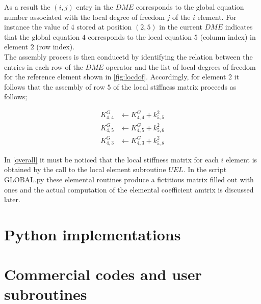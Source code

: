 As a result the $(i,j)$ entry in the $DME$ corresponds to the global equation number associated with the local degree of freedom $j$ of the $i$ element. For instance the value of $4$ stored at position $(2,5)$ in the current $DME$ indicates that the global equation $4$ corresponds to the local equation $5$ (column index) in element $2$ (row index).\\

The assembly process is then conducetd by identifying the relation between the entries in each row of the $DME$ operator and the list of local degrees of freedom for the reference element shown in \cref{fig:locdof}. Accordingly, for element 2 it follows that the assembly of row $5$ of the local stiffness matrix proceeds as follows;

\begin{align*}
K_{4,4}^G & \leftarrow  K_{4,4}^G + k_{5,5}^2 \\
K_{4,5}^G & \leftarrow  K_{4,5}^G + k_{5,6}^2 \\
K_{4,3}^G & \leftarrow  K_{4,3}^G + k_{5,8}^2
\end{align*}

In \cref{overall} it must be noticed that the local stiffness matrix for each $i$ element is obtained by the call to the local element subroutine $UEL$. In the script GLOBAL.py these elemental routines produce a fictitious matrix filled out with ones and the actual computation of the elemental coefficient amtrix is discussed later.
\section{Python implementations}
\section{Commercial codes and user subroutines}





